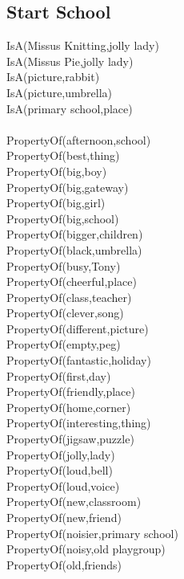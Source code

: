 \subsection{Start School}

\begin{multicols}{2}
\begin{footnotesize}
\noindent
IsA(Missus Knitting,jolly lady) \\
IsA(Missus Pie,jolly lady) \\
IsA(picture,rabbit) \\
IsA(picture,umbrella) \\
IsA(primary school,place) \\
~\\
PropertyOf(afternoon,school) \\
PropertyOf(best,thing) \\
PropertyOf(big,boy) \\
PropertyOf(big,gateway) \\
PropertyOf(big,girl) \\
PropertyOf(big,school) \\
PropertyOf(bigger,children) \\
PropertyOf(black,umbrella) \\
PropertyOf(busy,Tony) \\
PropertyOf(cheerful,place) \\
PropertyOf(class,teacher) \\
PropertyOf(clever,song) \\
PropertyOf(different,picture) \\
PropertyOf(empty,peg) \\
PropertyOf(fantastic,holiday) \\
PropertyOf(first,day) \\
PropertyOf(friendly,place) \\
PropertyOf(home,corner) \\
PropertyOf(interesting,thing) \\
PropertyOf(jigsaw,puzzle) \\
PropertyOf(jolly,lady) \\
PropertyOf(loud,bell) \\
PropertyOf(loud,voice) \\
PropertyOf(new,classroom) \\
PropertyOf(new,friend) \\
PropertyOf(noisier,primary school) \\
PropertyOf(noisy,old playgroup) \\
PropertyOf(old,friends) \\

\end{footnotesize}
\end{multicols}

